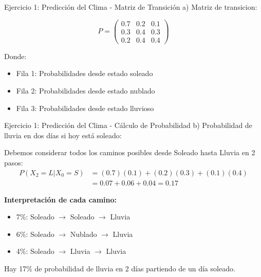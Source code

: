 \documentclass{beamer}
\begin{document}
\begin{frame}{Ejercicio 1: Predicción del Clima - Matriz de Transición}
    a) Matriz de transicion:
    \begin{center}
        \[P = \begin{pmatrix}
        0.7 & 0.2 & 0.1 \\
        0.3 & 0.4 & 0.3 \\
        0.2 & 0.4 & 0.4
        \end{pmatrix}\]
    \end{center}
    
    Donde:
    \begin{itemize}
        \item Fila 1: Probabilidades desde estado soleado
        \item Fila 2: Probabilidades desde estado nublado
        \item Fila 3: Probabilidades desde estado lluvioso
    \end{itemize}
\end{frame}

\begin{frame}{Ejercicio 1: Predicción del Clima - Cálculo de Probabilidad}
    \small
    b) Probabilidad de lluvia en dos días si hoy está soleado:

    \vspace{0.5em}

    Debemos considerar todos los caminos posibles desde Soleado hasta Lluvia en 2 pasos:
    \[
    \begin{split}
    P(X_2 = L | X_0 = S) &= (0.7)(0.1) + (0.2)(0.3) + (0.1)(0.4) \\
    &= 0.07 + 0.06 + 0.04 = 0.17
    \end{split}
    \]

    \textbf{Interpretación de cada camino:}
    \begin{itemize}
        \item 7\%: Soleado $\rightarrow$ Soleado $\rightarrow$ Lluvia
        \item 6\%: Soleado $\rightarrow$ Nublado $\rightarrow$ Lluvia
        \item 4\%: Soleado $\rightarrow$ Lluvia $\rightarrow$ Lluvia
    \end{itemize}

    \vspace{0.5em}

    Hay 17\% de probabilidad de lluvia en 2 días partiendo de un día soleado.
\end{frame}
\end{document}
